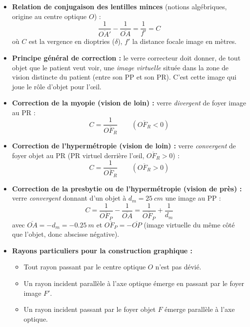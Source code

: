 \documentclass[11pt]{article}
\newcommand{\cle}[1]{{\popxbold\color{popdark}#1}}
\newcounter{popsec}
\newcounter{popsub}
\newcommand{\courssub}[1]{%
  \stepcounter{popsub}%
  \par\vspace{9pt}\noindent{\popxbold\fontsize{11.5}{13}\selectfont\color{popink}{\color{poporange}\thepopsec.\thepopsub}\hspace{6pt}#1}\par\nopagebreak\vspace{4pt}
}
\begin{document}
\courssub{Ressources à mobiliser}

\begin{aretenir}
\begin{itemize}
\item \textbf{Relation de conjugaison des lentilles minces} (notions algébriques, origine au centre optique $O$) :
\[ \frac{1}{\overline{OA'}} - \frac{1}{\overline{OA}} = \frac{1}{f'} = C \]
où $C$ est la vergence en dioptries ($\delta$), $f'$ la distance focale image en mètres.
\item \textbf{Principe général de correction :} le verre correcteur doit donner, de tout objet que le patient veut voir, une \emph{image virtuelle} située dans la \cle{zone de vision distincte} du patient (entre son PP et son PR). C'est cette image qui joue le rôle d'objet pour l'œil.
\item \textbf{Correction de la myopie (vision de loin) :} verre \emph{divergent} de foyer image au PR :
\[ C = \frac{1}{\overline{OF_R}} \qquad (\overline{OF_R} < 0) \]
\item \textbf{Correction de l'hypermétropie (vision de loin) :} verre \emph{convergent} de foyer objet au PR (PR virtuel derrière l'œil, $\overline{OF_R} > 0$) :
\[ C = \frac{1}{\overline{OF_R}} \qquad (\overline{OF_R} > 0) \]
\item \textbf{Correction de la presbytie ou de l'hypermétropie (vision de près) :} verre \emph{convergent} donnant d'un objet à $d_m = \SI{25}{cm}$ une image au PP :
\[ C = \frac{1}{\overline{OF_P}} - \frac{1}{\overline{OA}} = \frac{1}{\overline{OF_P}} + \frac{1}{d_m} \]
avec $\overline{OA} = -d_m = -\SI{0,25}{m}$ et $\overline{OF_P} = -\overline{OP}$ (image virtuelle du même côté que l'objet, donc abscisse négative).
\item \textbf{Rayons particuliers pour la construction graphique :}
\begin{itemize}
\item Tout rayon passant par le centre optique $O$ n'est pas dévié.
\item Un rayon incident parallèle à l'axe optique émerge en passant par le foyer image $F'$.
\item Un rayon incident passant par le foyer objet $F$ émerge parallèle à l'axe optique.
\end{itemize}
\end{itemize}
\end{aretenir}
\end{document}
